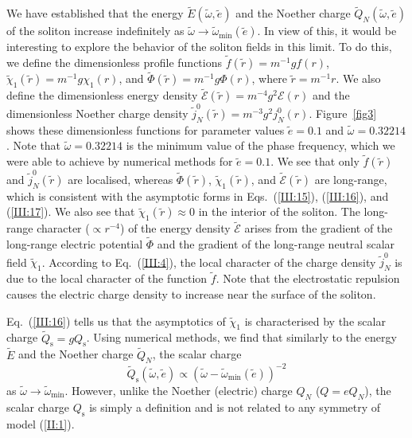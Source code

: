 We have established that  the  energy $\tilde{E}(\tilde{\omega},\tilde{e})$ and
the Noether  charge  $\tilde{Q}_{N}(\tilde{\omega}, \tilde{e})$  of the soliton
increase  indefinitely  as  $\tilde{\omega}  \rightarrow  \tilde{\omega}_{\min}
(\tilde{e})$.
In view of this, it would be interesting to explore the behavior of the soliton
fields in this limit.
To do this, we define the dimensionless profile functions $\tilde{f}(\tilde{r})
=  m^{-1} g f(r)$, $\tilde{\chi}_{1}(\tilde{r})  =  m^{-1}  g \chi_{1}(r)$, and
$\tilde{\Phi}(\tilde{r})  =  m^{-1}  g  \Phi(r)$, where $\tilde{r} = m^{-1} r$.
We also define the dimensionless energy density $\tilde{\mathcal{E}}(\tilde{r})
= m^{-4} g^{2} \mathcal{E}(r)$  and  the  dimensionless  Noether charge density
$\tilde{j}_{N}^{0}(\tilde{r}) = m^{-3} g^{2} j_{N}^{0}(r)$.
Figure~\ref{fig3} shows  these  dimensionless  functions  for  parameter values
$\tilde{e} = 0.1$ and $\tilde{\omega} = 0.32214$.
Note that $\tilde{\omega}=0.32214$ is the minimum value of the phase frequency,
which we were able  to  achieve  by  numerical  methods  for $\tilde{e} = 0.1$.
We see that only $\tilde{f}(\tilde{r})$  and $\tilde{j}^{0}_{N}(\tilde{r})$ are
localised,  whereas  $\tilde{\Phi}(\tilde{r})$,  $\tilde{\chi}_{1}(\tilde{r})$,
and $\tilde{\mathcal{E}}(\tilde{r})$   are  long-range,   which  is  consistent
with the  asymptotic   forms   in    Eqs.~(\ref{III:15}),   (\ref{III:16}), and
(\ref{III:17}).
We also see that $\tilde{\chi}_{1}(\tilde{r}) \approx 0$ in the interior of the
soliton.
The long-range character ($\propto r^{-4}$)   of   the  energy density $\tilde{
\mathcal{E}}$ arises from  the  gradient  of  the long-range electric potential
$\tilde{\Phi}$  and  the  gradient  of  the  long-range  neutral  scalar  field
$\tilde{\chi}_{1}$.
According to Eq.~(\ref{III:4}),  the  local  character  of  the  charge density
$\tilde{j}_{N}^{0}$ is due to the local character  of the function $\tilde{f}$.
Note that the electrostatic  repulsion  causes  the  electric charge density to
increase near the surface of the soliton.


Eq.~(\ref{III:16}) tells  us  that  the  asymptotics  of  $\tilde{\chi}_{1}$ is
characterised  by  the  scalar  charge $\tilde{Q}_{\text{s}} = g Q_{\text{s}}$.
Using numerical methods, we find  that  similarly to the energy $\tilde{E}$ and
the Noether charge $\tilde{Q}_{N}$, the scalar charge
\begin{equation}
\tilde{Q}_{\text{s}}\left(\tilde{\omega},\tilde{e}\right)
\propto \left(\tilde{\omega}-\tilde{\omega}_{\min}
\left(\tilde{e}\right)\right)^{-2}                                  \label{V:5}
\end{equation}
as $\tilde{\omega} \rightarrow \tilde{\omega}_{\min}$.
However,  unlike  the  Noether  (electric)  charge $Q_{N}$ ($Q = e Q_{N}$), the
scalar charge $Q_{\text{s}}$ is simply  a definition  and is not related to any
symmetry of model (\ref{II:1}).

